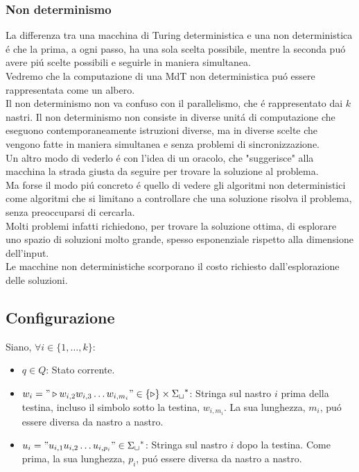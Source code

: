 \subsubsection{Non determinismo}
La differenza tra una macchina di Turing deterministica e una non deterministica 
é che la prima, a ogni passo, ha una sola scelta possibile, mentre la seconda puó 
avere piú scelte possibili e seguirle in maniera simultanea. \\
Vedremo che la computazione di una MdT non deterministica puó essere rappresentata 
come un albero. \\
Il non determinismo non va confuso con il parallelismo, che é rappresentato dai $k$ nastri. 
Il non determinismo non consiste in diverse unitá di computazione che eseguono 
contemporaneamente istruzioni diverse, ma in diverse scelte che vengono fatte in maniera 
simultanea e senza problemi di sincronizzazione. \\
Un altro modo di vederlo é con l'idea di un oracolo, che "suggerisce" alla macchina la strada
giusta da seguire per trovare la soluzione al problema. \\
Ma forse il modo piú concreto é quello di vedere gli algoritmi non deterministici come 
algoritmi che si limitano a controllare che una soluzione risolva il problema, senza 
preoccuparsi di cercarla. \\
Molti problemi infatti richiedono, per trovare la soluzione ottima, di esplorare uno spazio 
di soluzioni molto grande, spesso esponenziale rispetto alla dimensione dell'input. \\
Le macchine non deterministiche scorporano il costo richiesto dall'esplorazione delle soluzioni.


\subsection{Configurazione}
Siano, $\forall i \in \{1, \dots, k\}$:
\begin{itemize}
    \item $q \in Q$: Stato corrente.
    \item $w_i = "\triangleright w_{i,2} w_{i,3} \dots {w_{i,{m_i}}}" \in \{\triangleright\} \times {\Sigma_\sqcup}^*$: 
    Stringa sul nastro $i$ prima della testina, incluso il simbolo sotto la testina, $w_{i,m_i}$. La sua lunghezza, $m_i$, puó essere diversa da nastro a nastro.
    \item $u_i = "u_{i,1} u_{i,2} \dots u_{i,{p_i}}" \in {\Sigma_\sqcup}^*$: Stringa sul nastro $i$ dopo la testina. Come prima, la sua lunghezza, $p_i$, puó essere diversa da nastro a nastro.
\end{itemize}

